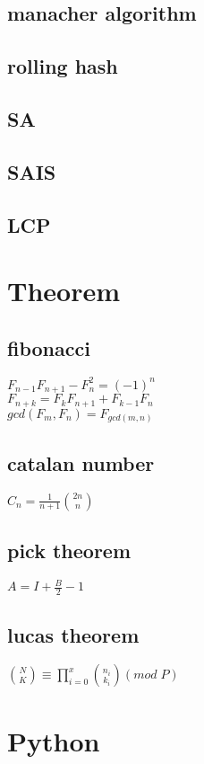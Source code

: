 \subsection{manacher algorithm}

\subsection{rolling hash}

\subsection{SA}

\subsection{SAIS}

\subsection{LCP}


\section{Theorem}
\doublespacing
\subsection{fibonacci}
\mbox{\Large\(F_{n-1} F_{n+1} - F_n^2 = (-1)^n\)}\\
\mbox{\Large\(F_{n+k} = F_k F_{n+1} + F_{k-1} F_n\)}\\
\mbox{\Large\(gcd(F_m, F_n) = F_{gcd(m, n)}\)}
\subsection{catalan number}
\mbox{\Large\(C_n = \frac{1}{n + 1} \binom{2n}{n}\)}
\subsection{pick theorem}
\mbox{\Large\(A=I+\frac{B}{2}-1\)}
\subsection{lucas theorem}
\mbox{\Large\(\binom{N}{K} \equiv \prod_{i=0}^{x}\binom{n_i}{k_i} (mod\;P)\)}
\singlespacing

\section{Python}


